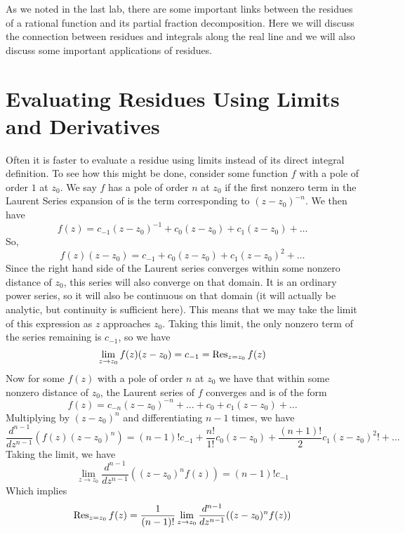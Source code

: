 

As we noted in the last lab, there are some important links between the residues of a rational function and its partial fraction decomposition.
Here we will discuss the connection between residues and integrals along the real line and we will also discuss some important applications of residues.

\section*{Evaluating Residues Using Limits and Derivatives}
Often it is faster to evaluate a residue using limits instead of its direct integral definition.
To see how this might be done, consider some function $f$ with a pole of order $1$ at $z_0$.
We say $f$ has a pole of order $n$ at $z_0$ if the first nonzero term in the Laurent Series expansion of is the term corresponding to $(z-z_0)^{-n}$.
We then have
$$f(z)=c_{-1}(z-z_0)^{-1}+c_0 (z-z_0) +c_1 (z-z_0) + \dots$$
So,
$$f(z)(z-z_0)=c_{-1}+c_0 (z-z_0) + c_1 (z-z_0)^2 + \dots$$
Since the right hand side of the Laurent series converges within some nonzero distance of $z_0$, this series will also converge on that domain.
It is an ordinary power series, so it will also be continuous on that domain (it will actually be analytic, but continuity is sufficient here).
This means that we may take the limit of this expression as $z$ approaches $z_0$.
Taking this limit, the only nonzero term of the series remaining is $c_{-1}$, so we have
\begin{equation*}
\lim_{z\to z_0} f(z)(z-z_0) = c_{-1} = \operatorname{Res}_{z=z_0} f(z)
\end{equation*}
Now for some $f(z)$ with a pole of order $n$ at $z_0$ we have that within some nonzero distance of $z_0$, the Laurent series of $f$ converges and is of the form
$$f(z)=c_{-n}(z-z_0)^{-n}+\dots+c_0+c_1(z-z_0)+\dots$$
Multiplying by $(z-z_0)^{n}$ and differentiating $n-1$ times, we have
$$\frac{d^{n-1}}{dz^{n-1}}(f(z)(z-z_0)^{n})=(n-1)! c_{-1} + \frac{n!}{1!} c_0 (z-z_0) + \frac{(n+1)!}{2} c_1 (z-z_0)^2!+\dots$$
Taking the limit, we have
\begin{equation*}
\lim_{z\to z_0}\frac{d^{n-1}}{dz^{n-1}}((z-z_0)^n f(z)) = (n-1)! c_{-1}
\end{equation*}
Which implies
\begin{equation*}
\operatorname{Res}_{z=z_0}f(z)=\frac{1}{(n-1)!}\lim_{z\to z_0}\frac{d^{n-1}}{dz^{n-1}}((z-z_0)^n f(z))
\end{equation*}	
